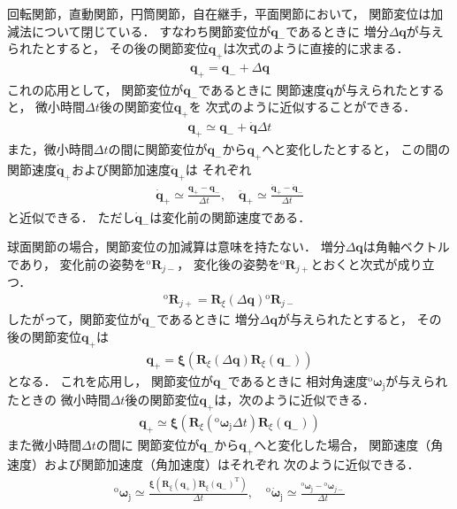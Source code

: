 ﻿\documentclass[a4paper]{jsarticle}
\begin{document}
回転関節，直動関節，円筒関節，自在継手，平面関節において，
関節変位は加減法について閉じている．
すなわち関節変位が$\bm{q}_{-}$であるときに
増分$\varDelta\bm{q}$が与えられたとすると，
その後の関節変位$\bm{q}_{+}$は次式のように直接的に求まる．
\begin{align*}
\bm{q}_{+}=\bm{q}_{-}+\varDelta\bm{q}
\end{align*}
これの応用として，
関節変位が$\bm{q}_{-}$であるときに
関節速度$\dot{\bm{q}}$が与えられたとすると，
微小時間$\varDelta t$後の関節変位$\bm{q}_{+}$を
次式のように近似することができる．
\begin{align*}
\bm{q}_{+}\simeq\bm{q}_{-}+\dot{\bm{q}}\varDelta t
\end{align*}
また，微小時間$\varDelta t$の間に関節変位が$\bm{q}_{-}$から$\bm{q}_{+}$へと変化したとすると，
この間の関節速度$\dot{\bm{q}}_{+}$および関節加速度$\ddot{\bm{q}}_{+}$は
それぞれ
\begin{align*}
\dot{\bm{q}}_{+}\simeq\frac{\bm{q}_{+}-\bm{q}_{-}}{\varDelta t},\quad
\ddot{\bm{q}}_{+}\simeq\frac{\dot{\bm{q}}_{+}-\dot{\bm{q}}_{-}}{\varDelta t}
\end{align*}
と近似できる．
ただし$\dot{\bm{q}}_{-}$は変化前の関節速度である．

球面関節の場合，関節変位の加減算は意味を持たない．
増分$\varDelta\bm{q}$は角軸ベクトルであり，
変化前の姿勢を${}^{\mathrm{o}}\bm{R}_{j-}$，
変化後の姿勢を${}^{\mathrm{o}}\bm{R}_{j+}$とおくと次式が成り立つ．
\begin{align*}
{}^{\mathrm{o}}\bm{R}_{j+}=\bm{R}_{\xi}(\varDelta\bm{q}){}^{\mathrm{o}}\bm{R}_{j-}
\end{align*}
したがって，関節変位が$\bm{q}_{-}$であるときに
増分$\varDelta\bm{q}$が与えられたとすると，
その後の関節変位$\bm{q}_{+}$は
\begin{align*}
\bm{q}_{+}
=\bm{\xi}\left(\bm{R}_{\xi}(\varDelta\bm{q})\bm{R}_{\xi}(\bm{q}_{-})\right)
\end{align*}
となる．
これを応用し，
関節変位が$\bm{q}_{-}$であるときに
相対角速度${}^{\mathrm{o}}\bm{\omega}_{\mathrm{j}}$が与えられたときの
微小時間$\varDelta t$後の関節変位$\bm{q}_{+}$は，次のように近似できる．
\begin{align*}
\bm{q}_{+}
\simeq
\bm{\xi}\left(\bm{R}_{\xi}({}^{\mathrm{o}}\bm{\omega}_{\mathrm{j}}\varDelta t)\bm{R}_{\xi}(\bm{q}_{-})\right)
\end{align*}
また微小時間$\varDelta t$の間に
関節変位が$\bm{q}_{-}$から$\bm{q}_{+}$へと変化した場合，
関節速度（角速度）および関節加速度（角加速度）はそれぞれ
次のように近似できる．
\begin{align*}
{}^{\mathrm{o}}\bm{\omega}_{\mathrm{j}}\simeq
\frac{\bm{\xi}\left(\bm{R}_{\xi}(\bm{q}_{+})\bm{R}_{\xi}(\bm{q}_{-})^{\mathrm{T}}\right)}
     {\varDelta t},\quad
{}^{\mathrm{o}}\dot{\bm{\omega}}_{\mathrm{j}}\simeq
\frac{{}^{\mathrm{o}}\bm{\omega}_{\mathrm{j}}-{}^{\mathrm{o}}\bm{\omega}_{j-}}{\varDelta t}
\end{align*}
\end{document}
